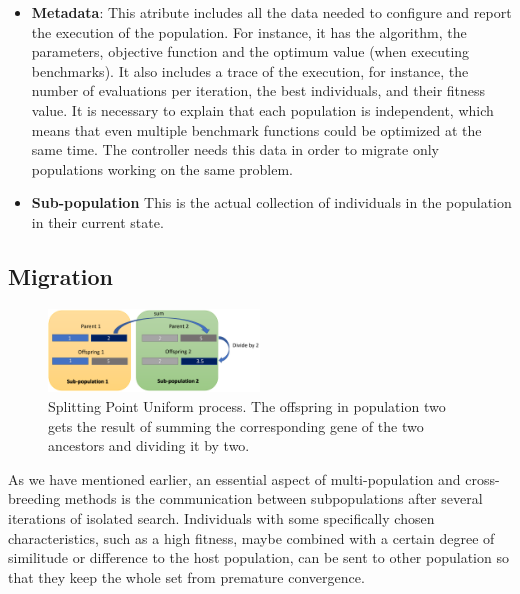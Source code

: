 \documentclass[runningheads]{llncs}
\begin{document}
\begin{itemize}
  \item {\bf Metadata}: This atribute includes all the data needed 
  to configure and report the execution of the population.
  For instance, it has the algorithm, the parameters, objective function and 
  the optimum value (when executing benchmarks). It also includes a trace of the execution, 
  for instance, the number of evaluations per iteration, 
  the best individuals, and their fitness value.  
  It is necessary to explain that each population is independent, which means
  that even multiple benchmark functions could be optimized at the same time.
  The controller needs this data in order to migrate only populations working on
  the same problem. 
  \item {\bf Sub-population} This is the actual collection of
  individuals in the population in their current state.  
\end{itemize}
%


\subsection{Migration} 
%
\begin{figure}[htp]
  \centering
  \includegraphics[width=0.5\textwidth]{img/splittinPointUniform.png}
  \caption{Splitting Point Uniform process. The offspring in
    population two gets the result of summing the corresponding gene
    of the two ancestors and dividing it by two.} \label{fig4}

\end{figure}

As we have mentioned earlier, an essential aspect of multi-population
and cross-breeding methods is the communication between subpopulations 
after several iterations of isolated
search. Individuals with some specifically chosen characteristics,
such as a high fitness, maybe combined with a certain degree of
similitude or difference to the host population, can be sent to other
population so that they keep the whole set from premature
convergence.
\end{document}

